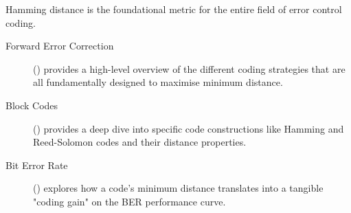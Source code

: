 \begin{importantbox}[title={Further Reading}]
    Hamming distance is the foundational metric for the entire field of error control coding.
    \begin{description}
        \item[Forward Error Correction] () provides a high-level overview of the different coding strategies that are all fundamentally designed to maximise minimum distance.
        \item[Block Codes] () provides a deep dive into specific code constructions like Hamming and Reed-Solomon codes and their distance properties.
        \item[Bit Error Rate] () explores how a code's minimum distance translates into a tangible "coding gain" on the BER performance curve.
    \end{description}
\end{importantbox}
